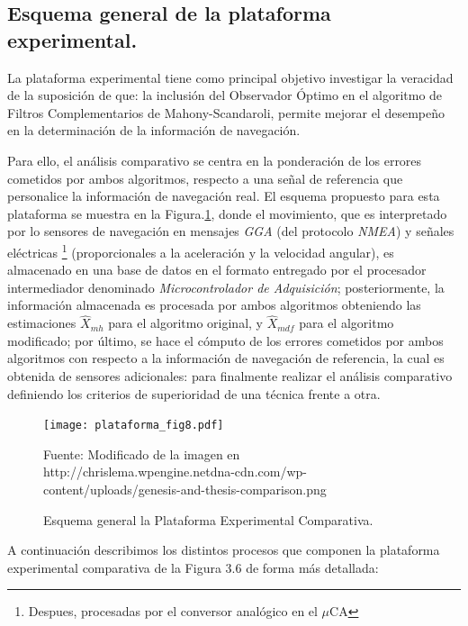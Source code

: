 \documentclass[10pt]{report}
\numberwithin{equation}{chapter}
\numberwithin{algorithm}{chapter}
\begin{document}
\subsection{Esquema general de la plataforma experimental.}
La plataforma experimental tiene como principal objetivo investigar la veracidad de la suposición de que: la inclusión del Observador Óptimo en el algoritmo de Filtros Complementarios de Mahony-Scandaroli, permite mejorar el desempeño en la determinación de la información de navegación.\par
Para ello, el análisis comparativo se centra en la ponderación de los errores cometidos por ambos algoritmos, respecto a una señal de referencia que personalice la información de navegación real. El esquema propuesto para esta plataforma se muestra en la Figura.\ref{plataforma_fig1}, donde el movimiento, que es interpretado por lo sensores de navegación en mensajes \emph{GGA} (del protocolo \emph{NMEA}) y señales eléctricas \footnote{Despues, procesadas por el conversor analógico en el $\mu$CA} (proporcionales a la aceleración y la velocidad angular), es almacenado en una base de datos en el formato entregado por el procesador intermediador denominado \emph{Microcontrolador de Adquisición}; posteriormente, la información almacenada es procesada por ambos algoritmos obteniendo las estimaciones $\hat{X}_{mh}$ para el algoritmo original, y $\hat{X}_{mdf}$ para el algoritmo modificado; por último, se hace el cómputo de los errores cometidos por ambos algoritmos con respecto a la información de navegación de referencia, la cual es obtenida de sensores adicionales: para finalmente realizar el análisis comparativo definiendo los criterios de superioridad de una técnica frente a otra.\par
\begin{figure}[t]
\centering
\texttt{[image: plataforma\_fig8.pdf]}
\caption{Esquema general la Plataforma Experimental Comparativa.}
\scriptsize{Fuente: Modificado de la imagen en http://chrislema.wpengine.netdna-cdn.com/wp-content/uploads/genesis-and-thesis-comparison.png}
\label{plataforma_fig1}
\end{figure} 
A continuación describimos los distintos procesos que componen la plataforma experimental comparativa de la Figura 3.6 de forma más detallada:
\end{document}
